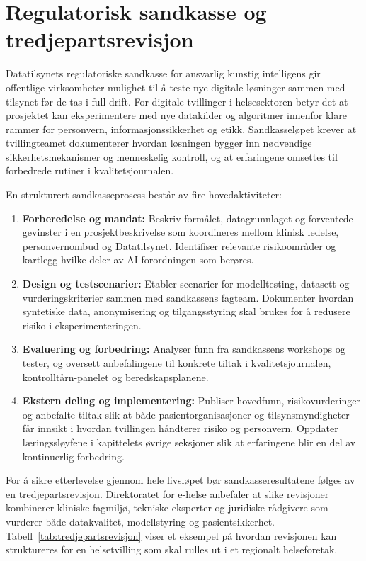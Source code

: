 \section{Regulatorisk sandkasse og tredjepartsrevisjon}
Datatilsynets regulatoriske sandkasse for ansvarlig kunstig intelligens gir offentlige virksomheter mulighet til å teste nye digitale løsninger sammen med tilsynet før de tas i full drift.\citep{datatilsynet2023sandkasse} For digitale tvillinger i helsesektoren betyr det at prosjektet kan eksperimentere med nye datakilder og algoritmer innenfor klare rammer for personvern, informasjonssikkerhet og etikk. Sandkasseløpet krever at tvillingteamet dokumenterer hvordan løsningen bygger inn nødvendige sikkerhetsmekanismer og menneskelig kontroll, og at erfaringene omsettes til forbedrede rutiner i kvalitetsjournalen.

En strukturert sandkasseprosess består av fire hovedaktiviteter:
\begin{enumerate}
    \item \textbf{Forberedelse og mandat:} Beskriv formålet, datagrunnlaget og forventede gevinster i en prosjektbeskrivelse som koordineres mellom klinisk ledelse, personvernombud og Datatilsynet. Identifiser relevante risikoområder og kartlegg hvilke deler av AI-forordningen som berøres.
    \item \textbf{Design og testscenarier:} Etabler scenarier for modelltesting, datasett og vurderingskriterier sammen med sandkassens fagteam. Dokumenter hvordan syntetiske data, anonymisering og tilgangsstyring skal brukes for å redusere risiko i eksperimenteringen.\citep{norm2023}
    \item \textbf{Evaluering og forbedring:} Analyser funn fra sandkassens workshops og tester, og oversett anbefalingene til konkrete tiltak i kvalitetsjournalen, kontrolltårn-panelet og beredskapsplanene.
    \item \textbf{Ekstern deling og implementering:} Publiser hovedfunn, risikovurderinger og anbefalte tiltak slik at både pasientorganisasjoner og tilsynsmyndigheter får innsikt i hvordan tvillingen håndterer risiko og personvern. Oppdater læringssløyfene i kapittelets øvrige seksjoner slik at erfaringene blir en del av kontinuerlig forbedring.
\end{enumerate}

For å sikre etterlevelse gjennom hele livsløpet bør sandkasseresultatene følges av en tredjepartsrevisjon. Direktoratet for e-helse anbefaler at slike revisjoner kombinerer kliniske fagmiljø, tekniske eksperter og juridiske rådgivere som vurderer både datakvalitet, modellstyring og pasientsikkerhet.\citep{ehelse2024tilsyn} Tabell~\ref{tab:tredjepartsrevisjon} viser et eksempel på hvordan revisjonen kan struktureres for en helsetvilling som skal rulles ut i et regionalt helseforetak.

